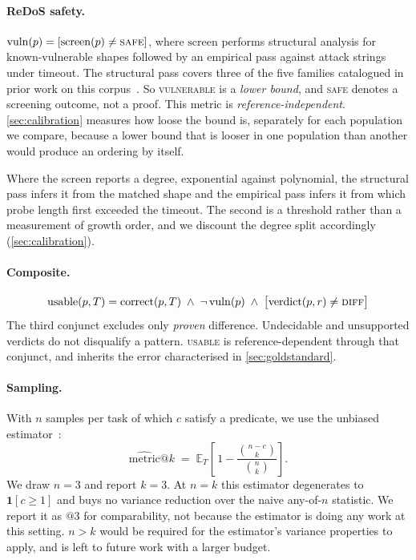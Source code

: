 \documentclass[11pt]{article}
\newcommand{\usable}{\textsc{usable}}
\newcommand{\vuln}{\textsc{vulnerable}}
\begin{document}
\paragraph{ReDoS safety.}
$\mathrm{vuln}(p) = [\mathrm{screen}(p) \neq \textsc{safe}]$, where
$\mathrm{screen}$ performs structural analysis for known-vulnerable shapes
followed by an empirical pass against attack strings under timeout. The
structural pass covers three of the five families catalogued
in prior work on this corpus~\citep{siddiq2024redos}. So \vuln{} is a \emph{lower bound}, and
\textsc{safe} denotes a screening outcome, not a proof. This metric is
\emph{reference-independent}. \cref{sec:calibration} measures how loose the
bound is, separately for each population we compare, because a lower bound
that is looser in one population than another would produce an ordering by
itself.

Where the screen reports a degree, exponential against polynomial, the
structural pass infers it from the matched shape and the empirical pass infers
it from which probe length first exceeded the timeout. The second is a
threshold rather than a measurement of growth order, and we discount the
degree split accordingly (\cref{sec:calibration}).

\paragraph{Composite.}
\[
\mathrm{usable}(p,T) = \mathrm{correct}(p,T)
  \;\wedge\; \neg\,\mathrm{vuln}(p)
  \;\wedge\; \big[\text{verdict}(p,r) \neq \textsc{diff}\big]
\]
The third conjunct excludes only \emph{proven} difference. Undecidable and
unsupported verdicts do not disqualify a pattern. \usable{} is
reference-dependent through that conjunct, and inherits the error
characterised in \cref{sec:goldstandard}.

\paragraph{Sampling.}
With $n$ samples per task of which $c$ satisfy a predicate, we use the
unbiased estimator~\citep{chen2021codex}:
\[
\widehat{\mathrm{metric}}@k \;=\;
\mathbb{E}_{T}\left[\,1 - \frac{\binom{n-c}{k}}{\binom{n}{k}}\right].
\]
We draw $n=3$ and report $k=3$. At $n=k$ this estimator degenerates to
$\mathbf{1}[c \geq 1]$ and
buys no variance reduction over the naive any-of-$n$ statistic. We report it as
$@3$ for comparability, not because the estimator is doing any work at this
setting.
$n>k$ would be required for the estimator's variance properties to apply,
and is left to future work with a larger budget.
\end{document}
